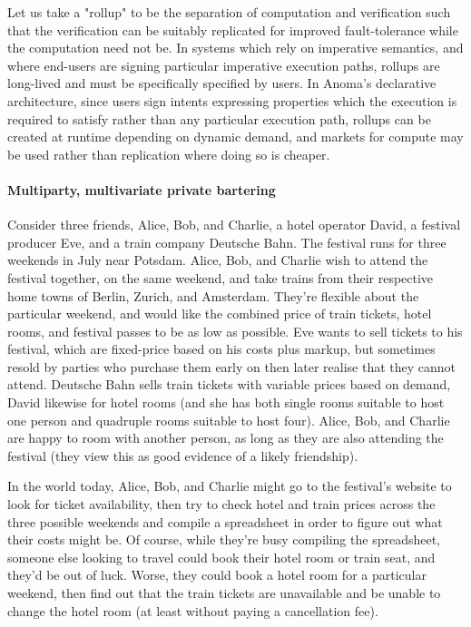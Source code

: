 \documentclass[
    9pt,            %
    commun,        %
    affiltop,       %
]{art}
\begin{document}
Let us take a "rollup" to be the separation of computation and
verification such that the verification can be suitably replicated for
improved fault-tolerance while the computation need not be. In systems
which rely on imperative semantics, and where end-users are signing
particular imperative execution paths, rollups are long-lived and must
be specifically specified by users. In Anoma's
declarative architecture, since users sign intents expressing properties
which the execution is required to satisfy rather than any particular
execution path, rollups can be created at runtime depending on dynamic
demand, and markets for compute may be used rather than replication
where doing so is cheaper.

\paragraph{Multiparty, multivariate private
bartering}\label{multiparty-multivariate-private-bartering}

Consider three friends, Alice, Bob, and Charlie, a hotel operator David,
a festival producer Eve, and a train company Deutsche Bahn. The festival
runs for three weekends in July near Potsdam. Alice, Bob, and Charlie
wish to attend the festival together, on the same weekend, and take
trains from their respective home towns of Berlin, Zurich, and
Amsterdam. They're flexible about the particular
weekend, and would like the combined price of train tickets, hotel
rooms, and festival passes to be as low as possible. Eve wants to sell
tickets to his festival, which are fixed-price based on his costs plus
markup, but sometimes resold by parties who purchase them early on then
later realise that they cannot attend. Deutsche Bahn sells train tickets
with variable prices based on demand, David likewise for hotel rooms
(and she has both single rooms suitable to host one person and quadruple
rooms suitable to host four). Alice, Bob, and Charlie are happy to room
with another person, as long as they are also attending the festival
(they view this as good evidence of a likely friendship).

In the world today, Alice, Bob, and Charlie might go to the
festival's website to look for ticket availability, then
try to check hotel and train prices across the three possible weekends
and compile a spreadsheet in order to figure out what their costs might
be. Of course, while they're busy compiling the
spreadsheet, someone else looking to travel could book their hotel room
or train seat, and they'd be out of luck. Worse, they
could book a hotel room for a particular weekend, then find out that the
train tickets are unavailable and be unable to change the hotel room (at
least without paying a cancellation fee).
\end{document}
